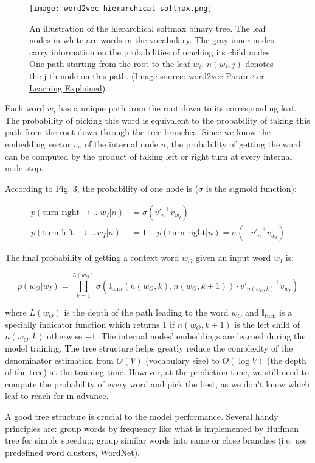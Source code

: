 \begin{figure}[h]
    \centering
    \texttt{[image: word2vec-hierarchical-softmax.png]}
    \caption{An illustration of the hierarchical softmax binary tree. The leaf nodes in white are words in the vocabulary. The gray inner nodes carry information on the probabilities of reaching its child nodes. One path starting from the root to the leaf $w_i$. $n(w_i, j)$ denotes the j-th node on this path. (Image source: \href{https://arxiv.org/pdf/1411.2738.pdf}{word2vec Parameter Learning Explained})}
\end{figure}

Each word $w_i$ has a unique path from the root down to its corresponding leaf. The probability of picking this word is equivalent to the probability of taking this path from the root down through the tree branches. Since we know the embedding vector $v_n$ of the internal node $n$, the probability of getting the word can be computed by the product of taking left or right turn at every internal node stop.

According to Fig. 3, the probability of one node is ($\sigma$ is the sigmoid function):

\begin{align*}
p(\text{turn right} \to \dots w_I \vert n) &= \sigma({v'_n}^{\top} v_{w_I})\\
p(\text{turn left } \to \dots w_I \vert n) &= 1 - p(\text{turn right} \vert n) = \sigma(-{v'_n}^{\top} v_{w_I})
\end{align*}

The final probability of getting a context word $w_O$ given an input word $w_I$ is:

\[
p(w_O \vert w_I) = \prod_{k=1}^{L(w_O)} \sigma(\mathbb{I}_{\text{turn}}(n(w_O, k), n(w_O, k+1)) \cdot {v'_{n(w_O, k)}}^{\top} v_{w_I})
\]

where $L(w_O)$ is the depth of the path leading to the word $w_O$ and $\mathbb{I}_{\text{turn}}$ is a specially indicator function which returns 1 if $n(w_O, k+1)$ is the left child of $n(w_O, k)$ otherwise $-1$. The internal nodes' embeddings are learned during the model training. The tree structure helps greatly reduce the complexity of the denominator estimation from $O(V)$ (vocabulary size) to $O(\log V)$ (the depth of the tree) at the training time. However, at the prediction time, we still need to compute the probability of every word and pick the best, as we don't know which leaf to reach for in advance.

A good tree structure is crucial to the model performance. Several handy principles are: group words by frequency like what is implemented by Huffman tree for simple speedup; group similar words into same or close branches (i.e. use predefined word clusters, WordNet).

